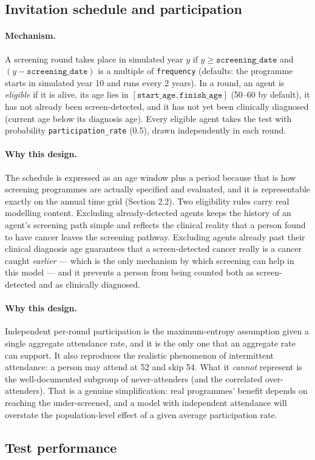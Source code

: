 \documentclass[12pt,a4paper]{article}
\newcommand{\id}[1]{\texttt{#1}}
\newcommand{\mech}[1]{\paragraph{Mechanism.} #1}
\newcommand{\why}[1]{\paragraph{Why this design.} #1}
\begin{document}
\subsection{Invitation schedule and participation}

\mech{A screening round takes place in simulated year $y$ if $y \ge \id{screening\_date}$ and
$(y - \id{screening\_date})$ is a multiple of \id{frequency} (defaults: the programme starts in simulated
year 10 and runs every 2 years). In a round, an agent is \emph{eligible} if it is alive, its age lies in
$[\id{start\_age}, \id{finish\_age}]$ (50--60 by default), it has not already been screen-detected, and it
has not yet been clinically diagnosed (current age below its diagnosis age). Every eligible agent takes the
test with probability \id{participation\_rate} (0.5), drawn independently in each round.}

\why{The schedule is expressed as an age window plus a period because that is how screening programmes are
actually specified and evaluated, and it is representable exactly on the annual time grid
(Section 2.2). Two eligibility rules carry real modelling content. Excluding already-detected agents keeps
the history of an agent's screening path simple and reflects the clinical reality that a person found to
have cancer leaves the screening pathway. Excluding agents already past their clinical diagnosis age
guarantees that a screen-detected cancer really is a cancer caught \emph{earlier} --- which is the only
mechanism by which screening can help in this model --- and it prevents a person from being counted both as
screen-detected and as clinically diagnosed.}

\why{Independent per-round participation is the maximum-entropy assumption given a single aggregate
attendance rate, and it is the only one that an aggregate rate can support. It also reproduces the
realistic phenomenon of intermittent attendance: a person may attend at 52 and skip 54. What it
\emph{cannot} represent is the well-documented subgroup of never-attenders (and the correlated
over-attenders). That is a genuine simplification: real programmes' benefit depends on reaching the
under-screened, and a model with independent attendance will overstate the population-level effect of a
given average participation rate.}

\subsection{Test performance}
\end{document}
